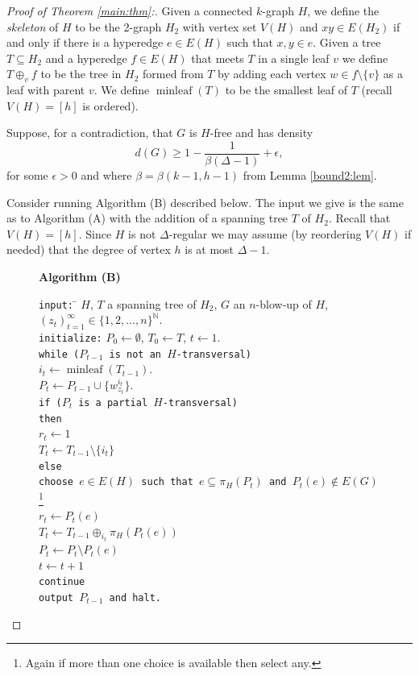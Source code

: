 \documentclass[12]{article}
\def\N{\mathbb{N}}
\DeclareMathOperator{\minl}{minleaf}
\begin{document}
\begin{proof}[Proof of Theorem \ref{main:thm}:]
Given a connected $k$-graph $H$, we define the \emph{skeleton} of $H$ to be the 2-graph $H_2$ with vertex set $V(H)$ and $xy\in E(H_2)$ if and only if there is a hyperedge $e\in E(H)$ such that $x,y\in e$. Given a tree $T\subseteq H_2$ and a hyperedge $f\in E(H)$ that meets $T$ in a single leaf $v$ we define $T\oplus_v f$ to be the tree in $H_2$ formed from $T$ by adding each vertex $w\in f\setminus\{v\}$ as a leaf with parent $v$.  We define $\minl(T)$ to be the smallest leaf of $T$ (recall $V(H)=[h]$ is ordered).

Suppose, for a contradiction, that $G$ is $H$-free and has density \[d(G)\geq 1-\frac{1}{\beta(\Delta-1)}+\epsilon,\] for some $\epsilon>0$ and where $\beta=\beta(k-1,h-1)$ from Lemma \ref{bound2:lem}.

Consider running Algorithm (B) described below. The input we give is the same as to Algorithm (A) with the addition of a spanning tree $T$ of $H_2$. Recall that $V(H)=[h]$. Since $H$ is not $\Delta$-regular we may assume (by reordering $V(H)$ if needed) that the degree of vertex $h$ is at most $\Delta-1$.
\begin{figure}
\begin{minipage}[c]{\textwidth}
  \textbf{Algorithm (B)}
\begin{tabbing} 
  \texttt{input:} \= $H$, $T$ a spanning tree of $H_2$, $G$ an $n$-blow-up of $H$, $(z_{t})_{t=1}^\infty\in\{1,2,\ldots,n\}^\N$.\\
  \texttt{initialize:}  $P_0\leftarrow\emptyset$, $T_0\leftarrow T$, $t\leftarrow1$.\\
 \texttt{wh}\=\texttt{ile ($P_{t-1}$ is not an $H$-transversal)} \\\> $i_t\leftarrow\minl(T_{t-1})$.\\
 \> $P_t\leftarrow P_{t-1}\cup\{w^{i_t}_{z_t}\}$.\\
\>\texttt{if }\=\texttt{($P_t$ is a partial $H$-transversal)}\\
\>\>\texttt{th}\=\texttt{en }\\
\>\>\>  $r_t\leftarrow1$\\
\>\>\> $T_t\leftarrow T_{t-1}\setminus \{i_t\}$\\
\>\> \texttt{el}\=\texttt{se}\\   
  \>\>\>\texttt{choose $e\in E(H)$ such that $e\subseteq \pi_H(P_t) $ and $P_t(e)\not\in E(G)$}\footnote[2]{Again if more than one choice is available then select any.}   \\  
  \>\>\>  $r_t\leftarrow P_t(e)$\\\>\>\> $T_t\leftarrow T_{t-1}\oplus_{i_t}\pi_H(P_t(e))$\\
  \>\>\> $P_t\leftarrow P_t\setminus P_t(e)$\\
  \>  $t\leftarrow t+1$\\
  \texttt{continue}\\
  \texttt{output $P_{t-1}$ and halt.}
\end{tabbing}
\end{minipage}
\end{figure}


\end{proof}
\end{document}
